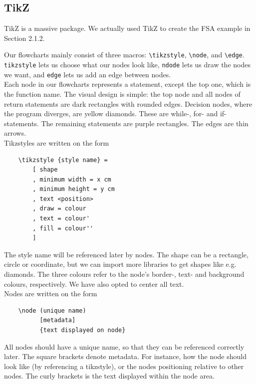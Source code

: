 \subsection{TikZ}

TikZ is a massive package. We actually used TikZ to create the FSA example in Section 2.1.2. \\


Our flowcharts mainly consist of three macros: \texttt{\textbackslash tikzstyle}, \texttt{\textbackslash node}, and \texttt{\textbackslash edge}. \texttt{tikzstyle} lets us choose what our nodes look like, \texttt{ndode} lets us draw the nodes we want, and \texttt{edge} lets us add an edge between nodes. \\

Each node in our flowcharts represents a statement, except the top one, which is the function name. The visual design is simple: the top node and all nodes of return statements are dark rectangles with rounded edges. Decision nodes, where the program diverges, are yellow diamonds. These are while-, for- and if-statements. The remaining statements are purple rectangles. The edges are thin arrows. \\

Tikzstyles are written on the form

\begin{verbatim}
    \tikzstyle {style name} =
        [ shape
        , minimum width = x cm
        , minimum height = y cm
        , text <position>
        , draw = colour
        , text = colour'
        , fill = colour''
        ]
\end{verbatim}

The style name will be referenced later by nodes. The shape can be a rectangle, circle or coordinate, but we can import more libraries to get shapes like e.g. diamonds. The three colours refer to the node's border-, text- and background colours, respectively. We have also opted to center all text. \\

Nodes are written on the form

\begin{verbatim}
    \node (unique name)
          [metadata]
          {text displayed on node}
\end{verbatim}

All nodes should have a unique name, so that they can be referenced correctly later. The square brackets denote metadata. For instance, how the node should look like (by referencing a tikzstyle), or the nodes positioning relative to other nodes. The curly brackets is the text displayed within the node area. \\

